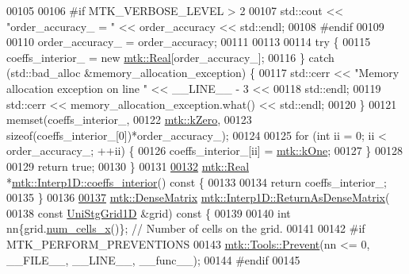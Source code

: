 \begin{DoxyCode}
00105 
00106 \textcolor{preprocessor}{  #if MTK\_VERBOSE\_LEVEL > 2}
00107   std::cout << \textcolor{stringliteral}{"order\_accuracy\_ = "} << order\_accuracy << std::endl;
00108 \textcolor{preprocessor}{  #endif}
00109 
00110   order\_accuracy\_ = order\_accuracy;
00111 
00113 
00114   \textcolor{keywordflow}{try} \{
00115     coeffs\_interior\_ = \textcolor{keyword}{new} \hyperlink{group__c01-roots_gac080bbbf5cbb5502c9f00405f894857d}{mtk::Real}[order\_accuracy\_];
00116   \} \textcolor{keywordflow}{catch} (std::bad\_alloc &memory\_allocation\_exception) \{
00117     std::cerr << \textcolor{stringliteral}{"Memory allocation exception on line "} << \_\_LINE\_\_ - 3 <<
00118       std::endl;
00119     std::cerr << memory\_allocation\_exception.what() << std::endl;
00120   \}
00121   memset(coeffs\_interior\_,
00122          \hyperlink{group__c01-roots_ga59a451a5fae30d59649bcda274fea271}{mtk::kZero},
00123          \textcolor{keyword}{sizeof}(coeffs\_interior\_[0])*order\_accuracy\_);
00124 
00125   \textcolor{keywordflow}{for} (\textcolor{keywordtype}{int} ii = 0; ii < order\_accuracy\_; ++ii) \{
00126     coeffs\_interior\_[ii] = \hyperlink{group__c01-roots_ga26407c24d43b6b95480943340d285c71}{mtk::kOne};
00127   \}
00128 
00129   \textcolor{keywordflow}{return} \textcolor{keyword}{true};
00130 \}
00131 
\hypertarget{mtk__interp__1d_8cc_source_l00132}{}\hyperlink{classmtk_1_1Interp1D_a652289cbb0000d3f4e5e8d632aaf4b03}{00132} \hyperlink{group__c01-roots_gac080bbbf5cbb5502c9f00405f894857d}{mtk::Real} *\hyperlink{classmtk_1_1Interp1D_a652289cbb0000d3f4e5e8d632aaf4b03}{mtk::Interp1D::coeffs\_interior}()\textcolor{keyword}{ const }\{
00133 
00134   \textcolor{keywordflow}{return} coeffs\_interior\_;
00135 \}
00136 
\hypertarget{mtk__interp__1d_8cc_source_l00137}{}\hyperlink{classmtk_1_1Interp1D_aee8126b8a4be378a30be4d95b43b384b}{00137} \hyperlink{classmtk_1_1DenseMatrix}{mtk::DenseMatrix} \hyperlink{classmtk_1_1Interp1D_aee8126b8a4be378a30be4d95b43b384b}{mtk::Interp1D::ReturnAsDenseMatrix}(
00138   \textcolor{keyword}{const} \hyperlink{classmtk_1_1UniStgGrid1D}{UniStgGrid1D} &grid)\textcolor{keyword}{ const }\{
00139 
00140   \textcolor{keywordtype}{int} nn\{grid.\hyperlink{classmtk_1_1UniStgGrid1D_af1b3729d8afa07be5b2775ed68015b80}{num\_cells\_x}()\}; \textcolor{comment}{// Number of cells on the grid.}
00141 
00142 \textcolor{preprocessor}{  #if MTK\_PERFORM\_PREVENTIONS}
00143   \hyperlink{classmtk_1_1Tools_a332324c6f25e66be9dff48c5987a3b9f}{mtk::Tools::Prevent}(nn <= 0, \_\_FILE\_\_, \_\_LINE\_\_, \_\_func\_\_);
00144 \textcolor{preprocessor}{  #endif}
00145 

\end{DoxyCode}

